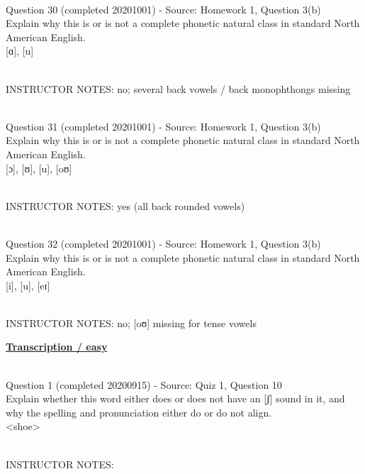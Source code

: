 \documentclass[12pt]{article}
\begin{document}
~\\

{\large Question 30} (completed 20201001) - Source: Homework 1, Question 3(b)\\

Explain why this is or is not a complete phonetic natural class in standard North American English.\\

{[ɑ]}, {[u]}


~\\
INSTRUCTOR NOTES: no; several back vowels / back monophthongs missing


~\\

{\large Question 31} (completed 20201001) - Source: Homework 1, Question 3(b)\\

Explain why this is or is not a complete phonetic natural class in standard North American English.\\

{[ɔ]}, {[ʊ]}, {[u]}, {[oʊ]}


~\\
INSTRUCTOR NOTES: yes (all back rounded vowels)


~\\

{\large Question 32} (completed 20201001) - Source: Homework 1, Question 3(b)\\

Explain why this is or is not a complete phonetic natural class in standard North American English.\\

{[i]}, {[u]}, {[eɪ]}


~\\
INSTRUCTOR NOTES: no; [oʊ] missing for tense vowels


\newpage\textbf{\underline{\huge Transcription / easy\\}}

~\\

{\large Question 1} (completed 20200915) - Source: Quiz 1, Question 10\\

Explain whether this word either does or does not have an [ʃ] sound in it, and why the spelling and pronunciation either do or do not align.\\

<shoe>


~\\
INSTRUCTOR NOTES: 
\end{document}
